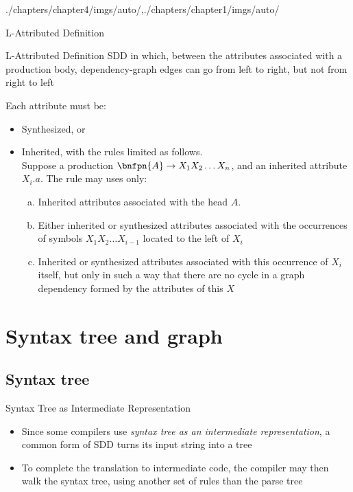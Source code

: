 \begin{graphicspathcontext}{{./chapters/chapter4/imgs/auto/},{./chapters/chapter1/imgs/auto/}}
\begin{bibunit}[apalike]
\begin{frame}{L-Attributed Definition}
	\begin{footnotesize}
	\begin{definitionblock}{L-Attributed Definition}
		SDD in which, between the attributes associated with a production body, dependency-graph edges can go from left to right, but not from right to left
	\end{definitionblock}
	\vspace{.5cm}
	Each attribute must be:
	\begin{itemize}
	\item Synthesized, or
	\item Inherited, with the rules limited as follows. \\
		Suppose a production $\bnfpn{A} \bnfopo X_1 X_2 \dots X_n$, and an inherited attribute $X_i.a$. The rule may uses only:
		\begin{enumerate}[a)]\footnotesize
		\item Inherited attributes associated with the head $A$.
		\item Either inherited or synthesized attributes associated with the occurrences of symbols $X_1 X_2 \dots X_{i-1}$ located to the left of $X_i$
		\item Inherited or synthesized attributes associated with this occurrence of $X_i$ itself, but only in such a way that there are no cycle in a graph dependency formed by the attributes of this $X$
		\end{enumerate}
	\end{itemize}
	\end{footnotesize}
\end{frame}

\section{Syntax tree and graph}
\sectiontableofcontentslide*

\subsection{Syntax tree}

\begin{frame}[background=6]{{Syntax Tree} as Intermediate Representation}
	\begin{itemize}
		\item Since some compilers use \emph{syntax tree as an intermediate representation}, a common form of SDD turns its input string into a tree
		\vfill
		\item To complete the translation to intermediate code, the compiler may then walk the syntax tree, using another set of rules than the parse tree
	\end{itemize}
\end{frame}


\end{bibunit}
\end{graphicspathcontext}
